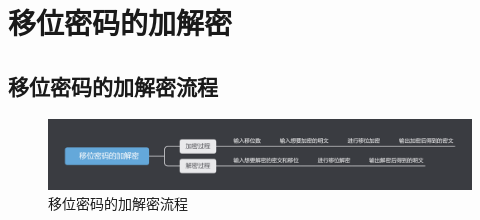 
\section{移位密码的加解密}

\subsection{移位密码的加解密流程}
\begin{figure}[thbp!]
	\centering
	\includegraphics[width=16cm]{figure/figure1.png}
	\caption{移位密码的加解密流程}
	\label{fig:移位密码的加解密流程}
\end{figure}

